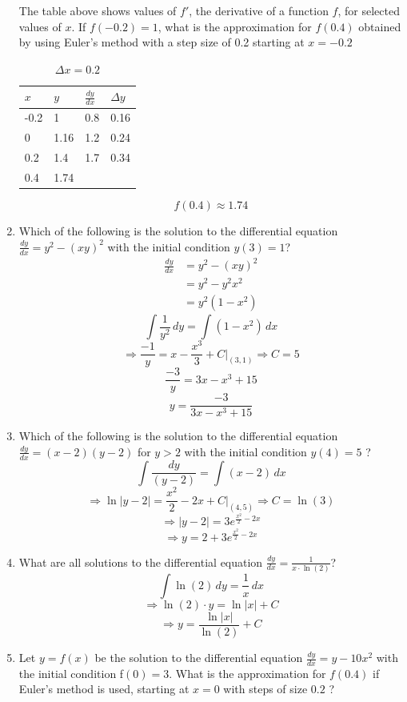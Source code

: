 \documentclass[12pt]{article}
\begin{document}
\begin{enumerate}
The table above shows values of $f'$, the derivative of a function $f$, for selected values of $x$. If $f(-0.2)=1$, what is the approximation for $f(0.4)$ obtained by using Euler’s method with a step size of 0.2 starting at $x=-0.2$

\begin{table}[H]
\caption{$\Delta x = 0.2$}
\centering \label{table_example}
\begin{tabular}{l|lll}
$x$ & \multicolumn{1}{l|}{$y$} & \multicolumn{1}{l|}{$\frac{dy}{dx}$} & $\Delta y$ \\ \hline
-0.2 & 1 & 0.8 & 0.16 \\
0 & 1.16 & 1.2 & 0.24 \\
0.2 & 1.4 & 1.7 & 0.34 \\
0.4 & 1.74 &  & 
\end{tabular}
\end{table}
$$\boxed{f(0.4) \approx 1.74}$$
\newpage
\item Which of the following is the solution to the differential equation $\frac{dy}{dx}=y^2-(xy)^2$ with the initial condition $y(3)=1$?
\begin{equation*} 
\begin{split}
\frac{dy}{dx} & = y^2-(xy)^2 \\
 & = y^2-y^2x^2\\
 & = y^2(1-x^2)
\end{split}
\end{equation*}
$$\int \frac{1}{y^2}\, dy = \int (1-x^2) \, dx$$
$$\Longrightarrow \frac{-1}{y}=x-\frac{x^3}{3} +C \biggr\rvert_{(3,1)} \Longrightarrow C=5 $$
$$\frac{-3}{y}=3x-x^3 +15 $$
$$y= \frac{-3}{3x-x^3+15}$$


\item Which of the following is the solution to the differential equation $\frac{dy}{dx}=(x-2)(y-2)$ for $y>2$ with the initial condition $y(4)=5$ ?
$$\int \frac{dy}{(y-2)}=\int {(x-2)} \, dx$$
$$\Longrightarrow \ln|y-2|=\frac{x^2}{2}-2x+C \biggr\rvert_{(4,5)} \Longrightarrow C=\ln(3)$$
$$\Longrightarrow |y-2|=3e^{\frac{x^2}{2}-2x}$$
$$\Longrightarrow y=2+3e^{\frac{x^2}{2}-2x}$$

\item What are all solutions to the differential equation $\frac{dy}{dx}=\frac{1}{x \cdot \ln(2)}$?
$$\int \ln(2) \, dy = \frac{1}{x} \, dx$$
$$\Longrightarrow \ln(2) \cdot y = \ln|x|+C$$
$$\Longrightarrow y = \frac{\ln|x|}{\ln(2)}+C$$

\item Let $y=f(x)$ be the solution to the differential equation $\frac{dy}{dx}=y-10x^2$ with the initial condition f$(0)=3$. What is the approximation for $f(0.4)$ if Euler’s method is used, starting at $x=0$ with steps of size $0.2$ ?


\end{enumerate}
\end{document}
